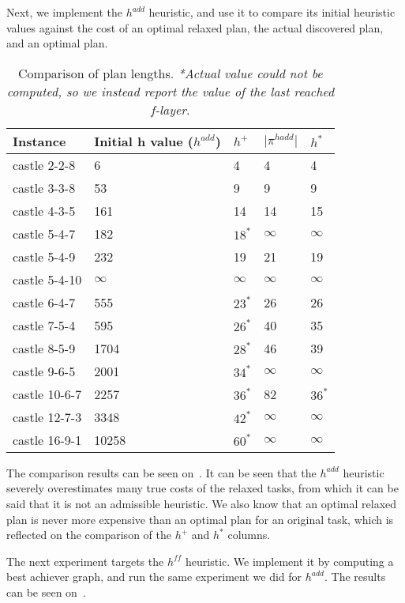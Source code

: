 \documentclass[11pt]{article}
\begin{document}
\begin{titlepage}
Next, we implement the $h^{add}$ heuristic, and use it to compare its initial heuristic values
against the cost of an optimal relaxed plan, the actual discovered plan, and an optimal plan.


\begin{table}
    \centering
    \begin{tabular}{l|l|l|l|l}
        Instance & Initial h value ($h^{add}$) & $h^+$  & $\lvert \pi^{hadd} \rvert$ & $h^*$ \\
        \hline
        castle 2-2-8 & 6 & 4 & 4 & 4 \\
        castle 3-3-8 & 53 & 9  & 9 & 9 \\
        castle 4-3-5 & 161 & 14 & 14 & 15 \\
        castle 5-4-7 & 182 & $18^*$ & $\infty$ & $\infty$ \\
        castle 5-4-9 & 232 & 19 & 21 & 19 \\
        castle 5-4-10 & $\infty$ & $\infty$ & $\infty$ & $\infty$ \\
        castle 6-4-7 & 555 & $23^*$ & 26 & 26 \\
        castle 7-5-4 & 595 & $26^*$ & 40 & 35 \\
        castle 8-5-9 & 1704 & $28^*$ & 46 & 39 \\
        castle 9-6-5 & 2001 & $34^*$ & $\infty$ & $\infty$ \\
        castle 10-6-7 & 2257 & $36^*$ & 82 & $36^*$ \\
        castle 12-7-3 & 3348 & $42^*$ & $\infty$ & $\infty$ \\
        castle 16-9-1 & 10258 & $60^*$ & $\infty$ & $\infty$ \\
    \end{tabular}
    \caption{Comparison of plan lengths. \textit{*Actual value could not be computed, so we instead
    report the value of the last reached f-layer}.
    }
    \label{tab:plan-length}
\end{table}

The comparison results can be seen on~. It can be seen that the $h^{add}$
heuristic severely overestimates many true costs of the relaxed tasks, from which it can be said
that it is not an admissible heuristic. We also know that an optimal relaxed plan is never more 
expensive than an optimal plan for an original task, which is reflected on the comparison of the
$h^+$ and $h^*$ columns.

The next experiment targets the $h^{ff}$ heuristic. We implement it by computing a best achiever
graph, and run the same experiment we did for $h^{add}$. The results can be seen
on~.


\end{titlepage}
\end{document}
